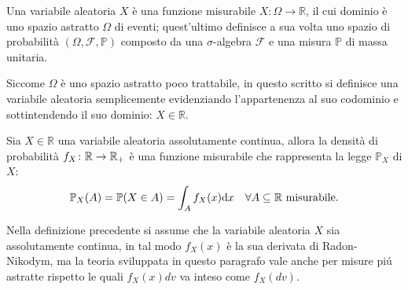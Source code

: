         \begin{dfn}
            \label{defVariabileAleatoria}
            Una variabile aleatoria \(X\) è una funzione misurabile \(X\colon\Omega\to\mathbb R\), il cui dominio è uno spazio astratto \(\Omega\) di eventi; quest'ultimo definisce a sua volta uno spazio di probabilità \((\Omega,\mathcal F,\mathbb P)\) composto da una \(\sigma\)-algebra \(\mathcal F\) e una misura \(\mathbb P\) di massa unitaria.

            Siccome \(\Omega\) è uno spazio astratto poco trattabile, in questo scritto si definisce una variabile aleatoria semplicemente evidenziando l'appartenenza al suo codominio e sottintendendo il suo dominio: \(X\in\mathbb R\).
        \end{dfn}

        \begin{dfn}
            \label{defDensitàProbabilità}
            Sia \(X\in\mathbb R\) una variabile aleatoria assolutamente continua, allora la densità di probabilità \(f_X\colon\mathbb R\to\mathbb R_+\) è una funzione misurabile che rappresenta la legge \(\mathbb P_X\) di \(X\):
            \[
                \mathbb P_X(A)=\mathbb P(X\in A)=\int_Af_X(x)\mathrm{d} x
                \quad\forall A\subseteq\mathbb R\text{ misurabile}.
            \]
        \end{dfn}

        \begin{oss}
            Nella definizione precedente si assume che la variabile aleatoria \(X\) sia assolutamente continua, in tal modo \(f_X(x)\) è la sua derivata di Radon-Nikodym, ma la teoria sviluppata in questo paragrafo vale anche per misure piú astratte rispetto le quali \(f_X(x)dv\) va inteso come \(f_X(dv)\).
        \end{oss}

